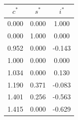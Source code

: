 \begin{tabular}{@{}ccc@{}}
\toprule
$c^*$ & $s^*$ & $i^*$ \\
\midrule
0.000 & 0.000 & 1.000 \\
0.000 & 1.000 & 0.000 \\
0.952 & 0.000 & -0.143 \\
1.000 & 0.000 & 0.000 \\
1.034 & 0.000 & 0.130 \\
1.190 & 0.371 & -0.083 \\
1.401 & 0.256 & -0.563 \\
1.415 & 0.000 & -0.629 \\
\bottomrule
\end{tabular}
